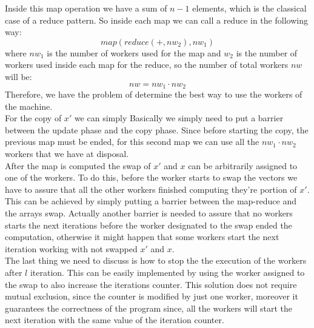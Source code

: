 \documentclass[12pt]{article}
\begin{document}
	Inside this map operation we have a sum of $n-1$ elements, which is the classical case of a reduce pattern. So inside each map we can call a reduce in the following way:
	\[
	map(reduce(+,nw_2), nw_1)
	\]
	where $nw_1$ is the number of workers used for the map and $w_2$ is the number of workers used inside each map for the reduce, so the number of total workers $nw$ will be:
	\[ nw = nw_1 \cdot nw_2 \]
	Therefore, we have the problem of determine the best way to use the workers of the machine. \\
	For the copy of $x\prime$ we can simply Basically we simply need to put a barrier between the update phase and the copy phase. Since before starting the copy, the previous map must be ended, for this second map we can use all the $nw_1\cdot nw_2$ workers that we have at disposal.\\
	After the map is computed the swap of $x\prime$ and $x$ can be arbitrarily assigned to one of the workers. To do this, before the worker starts to swap the vectors we have to assure that all the other workers finished computing they're portion of $x\prime$. This can be achieved by simply putting a barrier between the map-reduce and the arrays swap. Actually another barrier is needed to assure that no workers starts the next iterations before the worker designated to the swap ended the computation, otherwise it might happen that some workers start the next iteration working with not swapped $x\prime$ and $x$.\\
	The last thing we need to discuss is how to stop the the execution of the workers after $l$ iteration. This can be easily implemented by using the worker assigned to the swap to also increase the iterations counter. This solution does not require mutual exclusion, since the counter is modified by just one worker, moreover it guarantees the correctness of the program since, all the workers will start the next iteration with the same value of the iteration counter.
\end{document}
